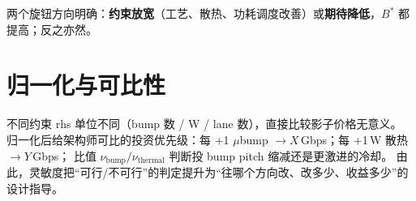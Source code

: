 两个旋钮方向明确：\textbf{约束放宽}（工艺、散热、功耗调度改善）或\textbf{期待降低}，$B^*$ 都提高；反之亦然。

\section{归一化与可比性}\label{sec:sens-norm}

不同约束 rhs 单位不同（bump 数 / W / lane 数），直接比较影子价格无意义。
归一化后给架构师可比的投资优先级：每 +1 $\mu$bump $\to X$\,Gbps；每 +1\,W 散热 $\to Y$\,Gbps；
比值 $\nu_{\text{bump}}/\nu_{\text{thermal}}$ 判断投 bump pitch 缩减还是更激进的冷却。
由此，灵敏度把``可行/不可行''的判定提升为``往哪个方向改、改多少、收益多少''的设计指导。
